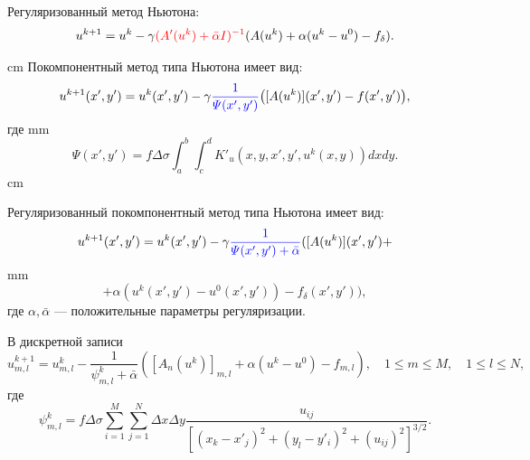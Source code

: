 \documentclass[10pt,pdf, mathserif, hyperref={unicode}]{beamer}
\begin{document}
%	
%

\begin{frame}{}
	 Регуляризованный метод Ньютона:
	$$ u^{k+1}=u^k-\gamma{\color{red}(A'(u^k)+\bar\alpha I)^{-1}}(A(u^k)+\alpha(u^k-u^0)-f_\delta).$$

	 cm
	Покомпонентный метод типа Ньютона имеет вид:
	$$u^{k+1}(x',y')=u^k(x',y')-\gamma{\color{blue}\frac{1}{\varPsi(x',y')}}\big([A(u^k)](x',y')-f(x',y')\big),$$
	где
	 mm $$\varPsi(x',y')=f\Delta\sigma\int_{a}^{b}\int_{c}^{d}K'_u(x,y, x',y',u^k(x,y)) dxdy.$$
	 cm

	Регуляризованный покомпонентный метод типа Ньютона имеет вид:
	$$u^{k+1}(x',y')=u^k(x',y')-\gamma{\color{blue}\frac{1}{\varPsi(x',y')+\bar{\alpha}}}([A(u^k)](x',y')+$$ 
 mm
	$$+\alpha (u^k(x',y')-u^0(x',y'))-f_\delta(x',y')),$$
	где $\alpha, \bar{\alpha}$ --- положительные параметры регуляризации.
	
	В дискретной записи
	$$u_{m,l}^{k+1}=u_{m,l}^k-\frac{1}{\psi_{m,l}^k+\bar\alpha}([A_n(u^k)]_{m,l} + \alpha(u^k-u^0) -f_{m,l}),\quad 1\le m \le M, \quad 1\le l \le N,$$
	где $$\psi_{m,l}^k=f\Delta\sigma\sum\limits_{i=1}^{M}\sum\limits_{j=1}^{N}
	\Delta x\Delta y\frac{u_{ij}}{[(x_k-x'_j)^2+(y_l-y'_i)^2+(u_{ij})^2]^{3/2}}.$$
	\let\thefootnote\relax\let\thefootnote\relax{}
\end{frame}
\end{document}
